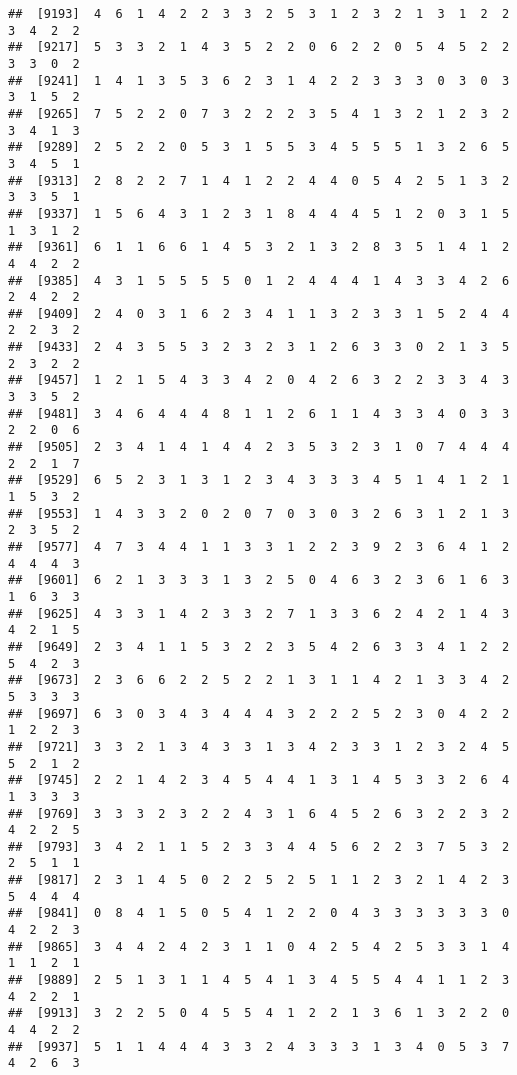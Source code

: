 \documentclass[
]{article}
\begin{document}
\begin{verbatim}
##  [9193]  4  6  1  4  2  2  3  3  2  5  3  1  2  3  2  1  3  1  2  2  3  4  2  2
##  [9217]  5  3  3  2  1  4  3  5  2  2  0  6  2  2  0  5  4  5  2  2  3  3  0  2
##  [9241]  1  4  1  3  5  3  6  2  3  1  4  2  2  3  3  3  0  3  0  3  3  1  5  2
##  [9265]  7  5  2  2  0  7  3  2  2  2  3  5  4  1  3  2  1  2  3  2  3  4  1  3
##  [9289]  2  5  2  2  0  5  3  1  5  5  3  4  5  5  5  1  3  2  6  5  3  4  5  1
##  [9313]  2  8  2  2  7  1  4  1  2  2  4  4  0  5  4  2  5  1  3  2  3  3  5  1
##  [9337]  1  5  6  4  3  1  2  3  1  8  4  4  4  5  1  2  0  3  1  5  1  3  1  2
##  [9361]  6  1  1  6  6  1  4  5  3  2  1  3  2  8  3  5  1  4  1  2  4  4  2  2
##  [9385]  4  3  1  5  5  5  5  0  1  2  4  4  4  1  4  3  3  4  2  6  2  4  2  2
##  [9409]  2  4  0  3  1  6  2  3  4  1  1  3  2  3  3  1  5  2  4  4  2  2  3  2
##  [9433]  2  4  3  5  5  3  2  3  2  3  1  2  6  3  3  0  2  1  3  5  2  3  2  2
##  [9457]  1  2  1  5  4  3  3  4  2  0  4  2  6  3  2  2  3  3  4  3  3  3  5  2
##  [9481]  3  4  6  4  4  4  8  1  1  2  6  1  1  4  3  3  4  0  3  3  2  2  0  6
##  [9505]  2  3  4  1  4  1  4  4  2  3  5  3  2  3  1  0  7  4  4  4  2  2  1  7
##  [9529]  6  5  2  3  1  3  1  2  3  4  3  3  3  4  5  1  4  1  2  1  1  5  3  2
##  [9553]  1  4  3  3  2  0  2  0  7  0  3  0  3  2  6  3  1  2  1  3  2  3  5  2
##  [9577]  4  7  3  4  4  1  1  3  3  1  2  2  3  9  2  3  6  4  1  2  4  4  4  3
##  [9601]  6  2  1  3  3  3  1  3  2  5  0  4  6  3  2  3  6  1  6  3  1  6  3  3
##  [9625]  4  3  3  1  4  2  3  3  2  7  1  3  3  6  2  4  2  1  4  3  4  2  1  5
##  [9649]  2  3  4  1  1  5  3  2  2  3  5  4  2  6  3  3  4  1  2  2  5  4  2  3
##  [9673]  2  3  6  6  2  2  5  2  2  1  3  1  1  4  2  1  3  3  4  2  5  3  3  3
##  [9697]  6  3  0  3  4  3  4  4  4  3  2  2  2  5  2  3  0  4  2  2  1  2  2  3
##  [9721]  3  3  2  1  3  4  3  3  1  3  4  2  3  3  1  2  3  2  4  5  5  2  1  2
##  [9745]  2  2  1  4  2  3  4  5  4  4  1  3  1  4  5  3  3  2  6  4  1  3  3  3
##  [9769]  3  3  3  2  3  2  2  4  3  1  6  4  5  2  6  3  2  2  3  2  4  2  2  5
##  [9793]  3  4  2  1  1  5  2  3  3  4  4  5  6  2  2  3  7  5  3  2  2  5  1  1
##  [9817]  2  3  1  4  5  0  2  2  5  2  5  1  1  2  3  2  1  4  2  3  5  4  4  4
##  [9841]  0  8  4  1  5  0  5  4  1  2  2  0  4  3  3  3  3  3  3  0  4  2  2  3
##  [9865]  3  4  4  2  4  2  3  1  1  0  4  2  5  4  2  5  3  3  1  4  1  1  2  1
##  [9889]  2  5  1  3  1  1  4  5  4  1  3  4  5  5  4  4  1  1  2  3  4  2  2  1
##  [9913]  3  2  2  5  0  4  5  5  4  1  2  2  1  3  6  1  3  2  2  0  4  4  2  2
##  [9937]  5  1  1  4  4  4  3  3  2  4  3  3  3  1  3  4  0  5  3  7  4  2  6  3

\end{verbatim}
\end{document}
